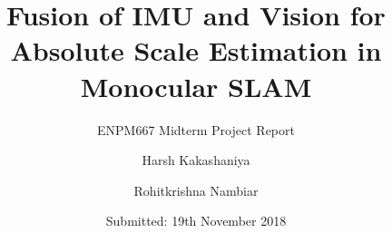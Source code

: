 \title{Fusion of IMU and Vision for Absolute Scale 
Estimation in Monocular SLAM%
}
\subtitle{ENPM667 Midterm Project Report}


\author{Harsh Kakashaniya         \and
        Rohitkrishna Nambiar%
}



\date{Submitted: 19th November 2018}


\maketitle

